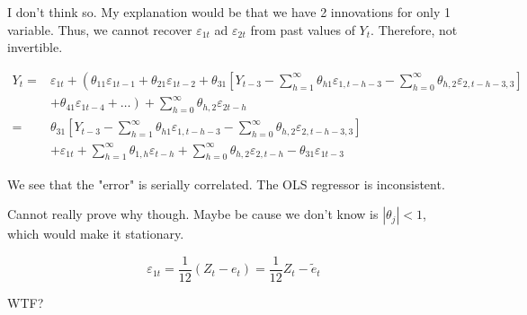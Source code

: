 {{\begin{enumerate}[label=(\alph*)]
{\item 
I don't think so. My explanation would be that we have 2 innovations for only 1 variable. Thus, we cannot recover $\varepsilon_{1 t}$ ad $\varepsilon_{2 t}$ from past values of $Y_{t}$. Therefore, not invertible.
}
{\item 
$$
\begin{aligned}
Y_{t}=&\varepsilon_{1 t}+\left(\theta_{11} \varepsilon_{1 t-1}+\theta_{21} \varepsilon_{1 t-2}+\theta_{31}\boxed{\left[Y_{t-3}-\sum_{h=1}^{\infty} \theta_{h 1} \varepsilon_{1, t-h-3}-\sum_{h=0}^{\infty} \theta_{h, 2} \varepsilon_{2, t-h-3,3}\right]}\right. \\
& \left.+\theta_{41} \varepsilon_{1 t-4}+\ldots\right)+\sum_{h=0}^{\infty} \theta_{h, 2} \varepsilon_{2 t-h} \\
=& \theta_{31}\boxed{\left[Y_{t-3}-\sum_{h=1}^{\infty} \theta_{h 1} \varepsilon_{1, t-h-3}-\sum_{h=0}^{\infty} \theta_{h, 2} \varepsilon_{2, t-h-3,3}\right]} \\
& +\varepsilon_{1 t}+\sum_{h=1}^{\infty} \theta_{1, h} \varepsilon_{t-h}+\sum_{h=0}^{\infty} \theta_{h, 2} \varepsilon_{2, t-h}-\theta_{31} \varepsilon_{1 t-3}
\end{aligned}
$$

We see that the "error" is serially correlated.
The OLS regressor is inconsistent. 

\color{red} Cannot really prove why though. Maybe be cause we don't know is $\left|\theta_{j}\right|<1$, which would make it stationary. \color{black}
}
{\item 
$$
\varepsilon_{1 t}=\frac{1}{12}\left(Z_{t}-e_{t}\right)=\frac{1}{12} Z_{t}-\tilde{e}_{t}
$$

\color{red} WTF? \color{black}
}
\end{enumerate}
}
}

